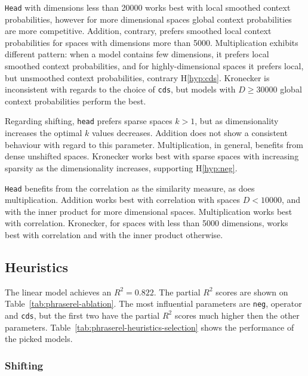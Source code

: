 \texttt{Head} with dimensions less than 20000 works best with local smoothed context probabilities, however for more dimensional spaces global context probabilities are more competitive. Addition, contrary, prefers smoothed local context probabilities for spaces with dimensions more than 5000. Multiplication exhibits different pattern: when a model contains few dimensions, it prefers local smoothed context probabilities, and for highly-dimensional spaces it prefers local, but unsmoothed context probabilities, contrary H\ref{hyp:cds}. Kronecker is inconsistent with regards to the choice of \texttt{cds}, but models with $D \geq 30000$ global context probabilities perform the best.

Regarding shifting, \texttt{head} prefers sparse spaces $k > 1$, but as dimensionality increases the optimal $k$ values decreases. Addition does not show a consistent behaviour with regard to this parameter. Multiplication, in general, benefits from dense unshifted spaces. Kronecker works best with sparse spaces with increasing sparsity as the dimensionality increases, supporting H\ref{hyp:neg}.

\texttt{Head} benefits from the correlation as the similarity measure, as does multiplication. Addition works best with correlation with spaces $D < 10000$, and with the inner product for more dimensional spaces. Multiplication works best with correlation. Kronecker, for spaces with less than 5000 dimensions, works best with correlation and with the inner product otherwise.

\subsection{Heuristics}
\label{sec:heuristics-phraserel}




The linear model achieves an $R^2 = 0.822$. The partial $R^2$ scores are shown on Table~\ref{tab:phraserel-ablation}. The most influential parameters are \texttt{neg}, operator and \texttt{cds}, but the first two have the partial $R^2$ scores much higher then the other parameters. Table~\ref{tab:phraserel-heuristics-selection} shows the performance of the picked models.

\subsubsection{Shifting}
\label{sec:shifting-phraserel}

